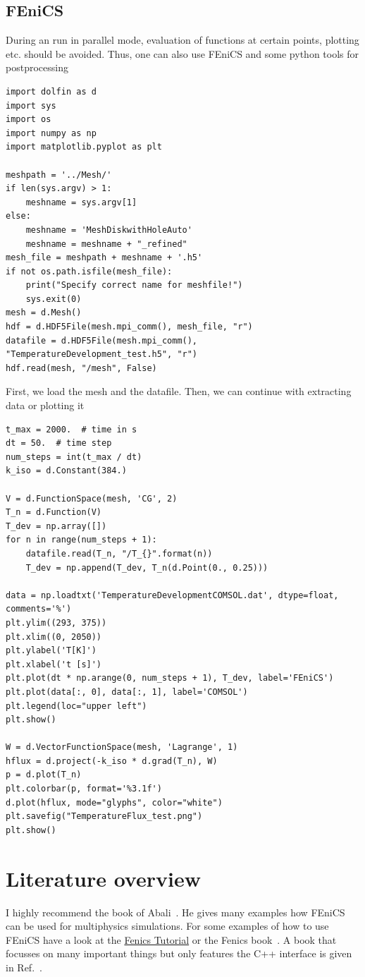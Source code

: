 \documentclass{article}
\begin{document}
\subsection{FEniCS}
During an run in parallel mode, evaluation of functions at certain points, plotting etc. should be avoided.
Thus, one can also use FEniCS and some python tools for postprocessing
\begin{lstlisting}
import dolfin as d
import sys
import os
import numpy as np
import matplotlib.pyplot as plt
    
meshpath = '../Mesh/'
if len(sys.argv) > 1:
    meshname = sys.argv[1]
else:
    meshname = 'MeshDiskwithHoleAuto'
    meshname = meshname + "_refined"
mesh_file = meshpath + meshname + '.h5'
if not os.path.isfile(mesh_file):
    print("Specify correct name for meshfile!")
    sys.exit(0)
mesh = d.Mesh()
hdf = d.HDF5File(mesh.mpi_comm(), mesh_file, "r")
datafile = d.HDF5File(mesh.mpi_comm(), "TemperatureDevelopment_test.h5", "r")
hdf.read(mesh, "/mesh", False)
\end{lstlisting}
First, we load the mesh and the datafile.
Then, we can continue with extracting data or plotting it
\begin{lstlisting}
t_max = 2000.  # time in s
dt = 50.  # time step
num_steps = int(t_max / dt)
k_iso = d.Constant(384.)
    
V = d.FunctionSpace(mesh, 'CG', 2)
T_n = d.Function(V)
T_dev = np.array([])
for n in range(num_steps + 1):
    datafile.read(T_n, "/T_{}".format(n))
    T_dev = np.append(T_dev, T_n(d.Point(0., 0.25)))

data = np.loadtxt('TemperatureDevelopmentCOMSOL.dat', dtype=float, comments='%')
plt.ylim((293, 375))
plt.xlim((0, 2050))
plt.ylabel('T[K]')
plt.xlabel('t [s]')
plt.plot(dt * np.arange(0, num_steps + 1), T_dev, label='FEniCS')
plt.plot(data[:, 0], data[:, 1], label='COMSOL')
plt.legend(loc="upper left") 
plt.show()

W = d.VectorFunctionSpace(mesh, 'Lagrange', 1)
hflux = d.project(-k_iso * d.grad(T_n), W)
p = d.plot(T_n)
plt.colorbar(p, format='%3.1f')
d.plot(hflux, mode="glyphs", color="white")
plt.savefig("TemperatureFlux_test.png")
plt.show()
\end{lstlisting}
\section{Literature overview}
I highly recommend the book of Abali~\cite{Abali2017}. 
He gives many examples how FEniCS can be used for multiphysics simulations.
For some examples of how to use FEniCS have a look at the \href{https://fenicsproject.org/pub/tutorial/html/ftut1.html}{Fenics Tutorial} or the Fenics book~\cite{LoggMardalEtAl2012a}.
A book that focusses on many important things but only features the C++ interface is given in Ref.~\cite{vabishchevich2015computational}.


\end{document}
